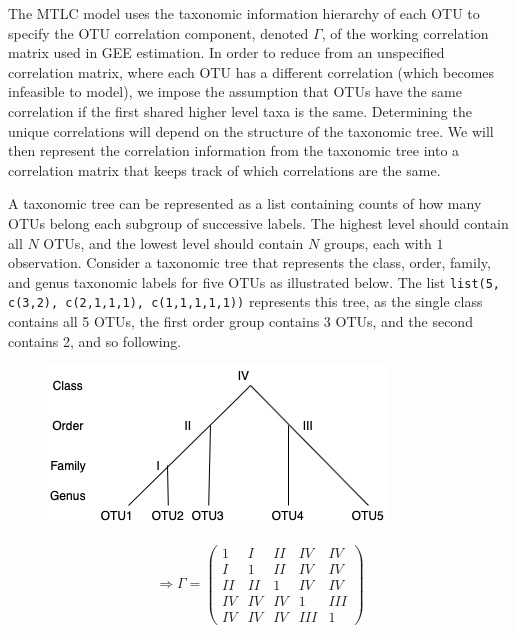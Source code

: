 \documentclass[12pt]{article}
\begin{document}
The MTLC model uses the taxonomic information hierarchy of each OTU to specify the OTU correlation component, denoted $\Gamma$, of the working correlation matrix used in GEE estimation. In order to reduce from an unspecified correlation matrix, where each OTU has a different correlation (which becomes infeasible to model), we impose the assumption that OTUs have the same correlation if the first shared higher level taxa is the same. Determining the unique correlations will depend on the structure of the taxonomic tree. We will then represent the correlation information from the taxonomic tree into a correlation matrix that keeps track of which correlations are the same.


A taxonomic tree can be represented as a list containing counts of how many OTUs belong each subgroup of successive labels. The highest level should contain all $N$ OTUs, and the lowest level should contain $N$ groups, each with $1$ observation. Consider a taxonomic tree that represents the class, order, family, and genus taxonomic labels for five OTUs as illustrated below. The list \texttt{list(5, c(3,2), c(2,1,1,1), c(1,1,1,1,1))} represents this tree, as the single class contains all 5 OTUs, the first order group contains 3 OTUs, and the second contains 2, and so following.

\begin{figure}
\begin{minipage}{.5\textwidth}
    \centering
    \includegraphics[width = .8\textwidth]{tree.png}
\end{minipage}%
\begin{minipage}{0.5\textwidth}
    \centering
    $$ \Rightarrow  \Gamma =\begin{pmatrix}
            1 & I & II & IV & IV \\
            I & 1 & II & IV & IV \\
            II & II & 1 & IV & IV \\
            IV & IV & IV & 1 & III \\
            IV & IV & IV & III & 1
      \end{pmatrix} $$
\end{minipage}
\end{figure}
\end{document}
